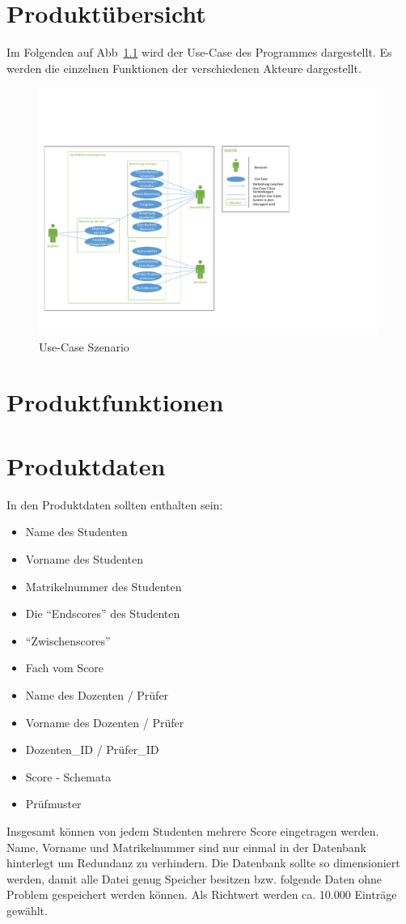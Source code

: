 \documentclass[a4paper,listof=leveldown,listof=numbered]{scrreprt}
\begin{document}
\chapter{Produktübersicht}
	Im Folgenden auf Abb~\ref{fig:usecase} wird der Use-Case des Programmes dargestellt. Es werden die einzelnen Funktionen der verschiedenen Akteure dargestellt.
	\begin{figure}[H]
		\centering
		\includegraphics[width=0.99\textwidth]{../Diagramme/Use_Case.pdf}
		\caption{Use-Case Szenario}
		\label{fig:usecase}
	\end{figure}

\chapter{Produktfunktionen}
	
	
\chapter{Produktdaten}
	In den Produktdaten sollten enthalten sein:
	\begin{itemize}
		\item Name des Studenten
		\item Vorname des Studenten
		\item Matrikelnummer des Studenten
		\item Die "`Endscores"' des Studenten
		\item "`Zwischenscores"' 
		\item Fach vom Score 
		\item Name des Dozenten / Prüfer
		\item Vorname des Dozenten / Prüfer
		\item Dozenten\_ID / Prüfer\_ID
		\item Score - Schemata
		\item Prüfmuster

	\end{itemize}
	Insgesamt können von jedem Studenten mehrere Score eingetragen werden. Name, Vorname und Matrikelnummer sind nur einmal in der Datenbank hinterlegt um Redundanz zu verhindern. 
	Die Datenbank sollte so dimensioniert werden, damit alle Datei genug Speicher besitzen bzw. folgende Daten ohne Problem gespeichert werden können. Als Richtwert werden ca. 10.000 Einträge gewählt. 
	
\end{document}
